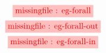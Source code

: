 \begin{gather}
  \tikzfig{1}{0.5}{eg-forall} \label{eq:eg-forall} \\
  \tikzfig{1}{0.5}{eg-forall-out} \label{eq:eg-forall-out} \\
  \tikzfig{1}{0.5}{eg-forall-in} \label{eq:eg-forall-in}
\end{gather}